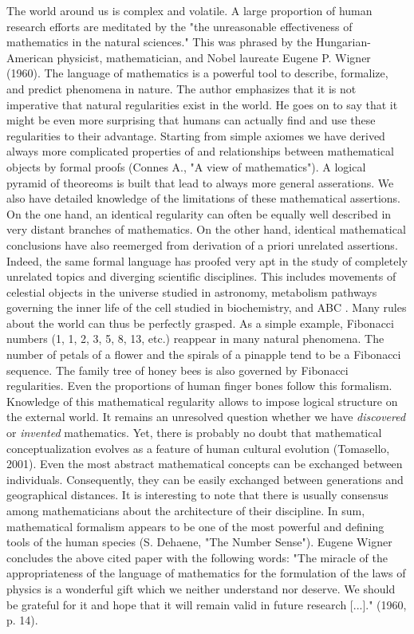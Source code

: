 \documentclass[authoryear,review,3p]{elsarticle}
\begin{document}
The world around us is complex and volatile.
%
A large proportion of human research efforts are meditated by the 
"the unreasonable effectiveness of mathematics in the natural sciences."
This was phrased by the Hungarian-American
physicist, mathematician, and Nobel laureate Eugene P. Wigner (1960).
The language of mathematics is a powerful tool to
describe, formalize, and predict phenomena in nature.
The author emphasizes that it is not imperative that
natural regularities exist in the world. He goes on to
say that it might be even more surprising that humans can actually
find and use these regularities to their advantage.
%
Starting from simple axiomes we have derived always more complicated
properties of and relationships between mathematical objects by formal proofs
(Connes A., "A view of mathematics").
A logical pyramid of theoreoms is built that lead to always
more general asserations.
We also have detailed knowledge of the limitations of these mathematical
assertions.
%
On the one hand,
an identical regularity can often be equally well described in very distant
branches of mathematics.
On the other hand,
identical mathematical conclusions have also reemerged from derivation of
a priori unrelated assertions.
%
Indeed, the same formal language has proofed very apt in
the study of completely unrelated topics and diverging scientific disciplines.
This includes movements of celestial objects in the universe studied in astronomy,
metabolism pathways governing the inner life of the cell studied in biochemistry,
and
ABC
.
%
Many rules about the world can thus be perfectly grasped.
As a simple example,
Fibonacci numbers (1, 1, 2, 3, 5, 8, 13, etc.)
reappear in many natural phenomena.
The number of petals of a flower and the spirals of a pinapple tend
to be a Fibonacci sequence.
The family tree of honey bees is also governed by Fibonacci regularities.
Even the proportions of human finger bones follow this formalism.
Knowledge of this mathematical regularity
allows to impose logical structure on the external world.
%
It remains an unresolved question whether we have
\textit{discovered} or \textit{invented} mathematics.
Yet, there is probably no doubt
that mathematical conceptualization
evolves as a feature of human cultural evolution (Tomasello, 2001).
Even the most abstract mathematical concepts can
be exchanged between individuals. Consequently,
they can be easily exchanged between generations and geographical distances.
It is interesting to note that there is usually consensus among mathematicians
about the architecture of their discipline.
In sum, mathematical formalism
appears to be one of the most
powerful and defining tools of the human species
(S. Dehaene, "The Number Sense").
Eugene Wigner concludes the above cited paper with the following words:
"The miracle of the appropriateness of the language of mathematics
for the formulation of the laws of physics is a wonderful gift
which we neither understand nor deserve. We should be grateful for
it and hope that it will remain valid in future research [...]."
(1960, p. 14).
\end{document}
